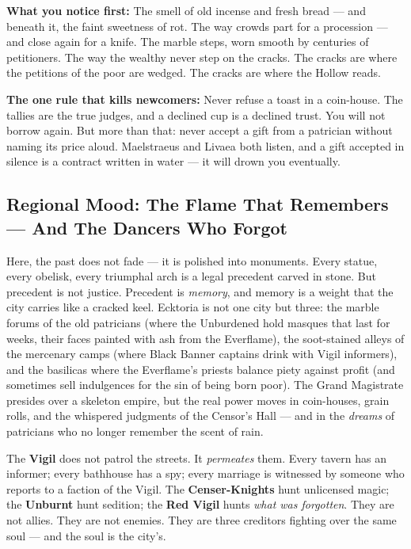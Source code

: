 \vspace{2mm}
\textbf{What you notice first:} The smell of old incense and fresh bread --- and beneath it, the faint sweetness of rot. The way crowds part for a procession --- and close again for a knife. The marble steps, worn smooth by centuries of petitioners. The way the wealthy never step on the cracks. The cracks are where the petitions of the poor are wedged. The cracks are where the Hollow reads.

\textbf{The one rule that kills newcomers:} Never refuse a toast in a coin-house. The tallies are the true judges, and a declined cup is a declined trust. You will not borrow again. But more than that: never accept a gift from a patrician without naming its price aloud. Maelstraeus and Livaea both listen, and a gift accepted in silence is a contract written in water --- it will drown you eventually.

\subsection*{Regional Mood: The Flame That Remembers --- And The Dancers Who Forgot}

Here, the past does not fade --- it is polished into monuments. Every statue, every obelisk, every triumphal arch is a legal precedent carved in stone. But precedent is not justice. Precedent is \textit{memory}, and memory is a weight that the city carries like a cracked keel. Ecktoria is not one city but three: the marble forums of the old patricians (where the Unburdened hold masques that last for weeks, their faces painted with ash from the Everflame), the soot-stained alleys of the mercenary camps (where Black Banner captains drink with Vigil informers), and the basilicas where the Everflame's priests balance piety against profit (and sometimes sell indulgences for the sin of being born poor). The Grand Magistrate presides over a skeleton empire, but the real power moves in coin-houses, grain rolls, and the whispered judgments of the Censor's Hall --- and in the \textit{dreams} of patricians who no longer remember the scent of rain.

The \textbf{Vigil} does not patrol the streets. It \emph{permeates} them. Every tavern has an informer; every bathhouse has a spy; every marriage is witnessed by someone who reports to a faction of the Vigil. The \textbf{Censer-Knights} hunt unlicensed magic; the \textbf{Unburnt} hunt sedition; the \textbf{Red Vigil} hunts \emph{what was forgotten}. They are not allies. They are not enemies. They are three creditors fighting over the same soul --- and the soul is the city's.

